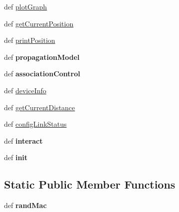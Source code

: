 \begin{DoxyCompactItemize}
\item 
def \hyperlink{classmininet_1_1net_1_1Mininet_a1a566534520203aafbe1fecd2868c09c}{plot\-Graph}
\item 
def \hyperlink{classmininet_1_1net_1_1Mininet_ab5c13aae58329b94796b9d335ab92874}{get\-Current\-Position}
\item 
def \hyperlink{classmininet_1_1net_1_1Mininet_ad8d38777ffb1dde3484087413f3dcaef}{print\-Position}
\item 
\hypertarget{classmininet_1_1net_1_1Mininet_a84b9e166b58252d6233c040c5f5cd12b}{def {\bfseries propagation\-Model}}\label{classmininet_1_1net_1_1Mininet_a84b9e166b58252d6233c040c5f5cd12b}

\item 
\hypertarget{classmininet_1_1net_1_1Mininet_afa0b6ed0abeca308c5c632ed3b4b714e}{def {\bfseries association\-Control}}\label{classmininet_1_1net_1_1Mininet_afa0b6ed0abeca308c5c632ed3b4b714e}

\item 
def \hyperlink{classmininet_1_1net_1_1Mininet_aa0a3f023a1c24eda79554683e1a9ae08}{device\-Info}
\item 
def \hyperlink{classmininet_1_1net_1_1Mininet_a8288273421854314b24af49d1c0074fa}{get\-Current\-Distance}
\item 
def \hyperlink{classmininet_1_1net_1_1Mininet_a027bfac6f90c3342e6ccd1de63f4591e}{config\-Link\-Status}
\item 
\hypertarget{classmininet_1_1net_1_1Mininet_a6604bea98cddc4f8ca5e8bf6fdb2d0ee}{def {\bfseries interact}}\label{classmininet_1_1net_1_1Mininet_a6604bea98cddc4f8ca5e8bf6fdb2d0ee}

\item 
\hypertarget{classmininet_1_1net_1_1Mininet_a62cf428f7718a375b6246b2995642c2d}{def {\bfseries init}}\label{classmininet_1_1net_1_1Mininet_a62cf428f7718a375b6246b2995642c2d}

\end{DoxyCompactItemize}
\subsection*{Static Public Member Functions}
\begin{DoxyCompactItemize}
\item 
\hypertarget{classmininet_1_1net_1_1Mininet_ae9ded3e770dd6473bc3bc15913572537}{def {\bfseries rand\-Mac}}\label{classmininet_1_1net_1_1Mininet_ae9ded3e770dd6473bc3bc15913572537}

\end{DoxyCompactItemize}
